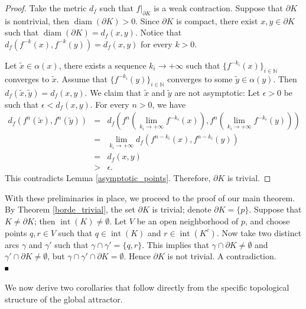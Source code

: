 \documentclass{amsart}
\newcommand{\N}{{\mathbb{N}}}
\def\blacksquare{\hbox{\vrule width 4pt height 4pt depth 0pt}}
\def\qed{\ \ \ \hbox{}\nolinebreak\hfill $\blacksquare \  \  \  \  $ \par{}\medskip}
\begin{document}
	\begin{proof}
		Take the metric $d_f$ such that $f|_{\partial K}$ is a weak contraction.
		Suppose that $\partial K$ is nontrivial, then $\operatorname{diam}(\partial K)>0$. 
		Since $\partial K$ is compact, there exist $x, y\in \partial K$ such that $\operatorname{diam}(\partial K)=d_f(x,y)$.
		Notice that $d_f(f^{-k}(x), f^{-k}(y))=d_f(x,y)$ for every $k>0$.
		
		Let $\tilde{x}\in \alpha(x)$, there exists a sequence $k_i\to +\infty$ such that $\{f^{-k_i}(x)\}_{i\in \N}$ converges to $\tilde{x}$.
		Assume that $\{ f^{-k_i}(y)\}_{i\in\N}$ converges to some $\tilde{y}\in\alpha(y)$. 
		Then $d_f(\tilde{x}, \tilde{y})=d_f(x,y)$.
		We claim that $\tilde{x}$ and $\tilde{y}$ are not asymptotic: 
		Let $\epsilon>0$ be such that $\epsilon<d_f(x,y)$.
		For every $n>0$, we have
		\begin{eqnarray*}
			d_f(f^{n}(\tilde{x}), f^{n}(\tilde{y})) 
			&=& d_f(f^{n}(\lim_{k_i\to+\infty} f^{-k_i}(x)), f^{n}(\lim_{k_i\to+\infty} f^{-k_i}(y))) \\
			&=& \lim_{k_i\to+\infty} d_f(f^{n-k_i}(x), f^{n-k_i}(y)) \\
			&=& d_f(x,y) \\
			&>& \epsilon.
		\end{eqnarray*}
		This contradicts Lemma \ref{asymptotic_points}. 
		Therefore, $\partial K$ is trivial. 
	\end{proof}
	
	With these preliminaries in place, we  proceed to the proof of our main theorem. \\
	
	By Theorem \ref{borde_trivial}, the set $\partial K$ is trivial; denote $\partial K=\{p\}$. 
	Suppose that $K\neq \partial K$; then $\operatorname{int}(K)\neq \emptyset$. 
	Let $V$ be an open neighborhood of $p$, and choose points $q,r\in V$ such that $q\in \operatorname{int}(K)$ and $r\in \operatorname{int}(K^c)$. 
	Now take two distinct arcs $\gamma$ and $\gamma'$ such that $\gamma\cap\gamma'=\{q,r\}$. 
	This implies that $\gamma\cap\partial K\neq\emptyset$ and $\gamma'\cap\partial K\neq\emptyset$, but $\gamma\cap\gamma'\cap\partial K=\emptyset$. 
	Hence $\partial K$ is not trivial. A contradiction. \qed
	
	
We now derive two corollaries that follow directly from the specific topological structure of the global attractor.	
\end{document}
